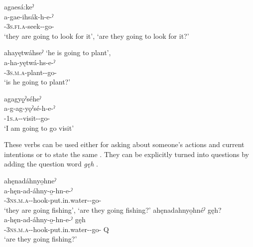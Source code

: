 \ex agaesá:keˀ \\
\gll a-gae-ihsák-h-e-ˀ\\
{\factual}-\textsc{3s.fi.a}-seek-{\dislocative}-go-{\punctual}\\
\glt ‘they are going to look for it’, ‘are they going to look for it?’

\ex ahayętwáhseˀ ‘he is going to plant’,\\
\gll a-ha-yętwá-hs-e-ˀ\\
 {\factual}-\textsc{3s.m.a}-plant-{\dislocative}-go-{\punctual}\\
\glt `is he going to plant?'

\ex agagyǫ̱ˀséheˀ\\
\gll a-g-ag-yǫˀsé-h-e-ˀ\\
 {\factual}-\textsc{1s.a}-{\semireflexive}-visit-{\dislocative}-go-{\punctual}\\
\glt `I am going to go visit'
\z
\z

\newpage
These verbs can be used either for asking about someone’s actions and current intentions or to state the same . They can be explicitly turned into questions by adding the question word \textit{gęh} .

\ea\label{ex:dislpurpfacex2}
\ea ahęnadáhnyo̱hneˀ\\\label{ex:dislpurpfacex2a}
\gll a-hęn-ad-áhny-o̱-hn-e-ˀ\\
 {\factual}-\textsc{3ns.m.a}-{\semireflexive}-hook-put.in.water-{\dislocative}-go-{\punctual}\\
\glt  ‘they are going fishing’, `are they going fishing?'
\ex ahęnadahnyo̱hnéˀ gęh?\\\label{ex:dislpurpfacex2b}
\gll a-hęn-ad-áhny-o̱-hn-e-ˀ gęh\\
 {\factual}-\textsc{3ns.m.a}-{\semireflexive}-hook-put.in.water-{\dislocative}-go-{\punctual} Q\\
\glt `are they going fishing?' 
\z
\z

